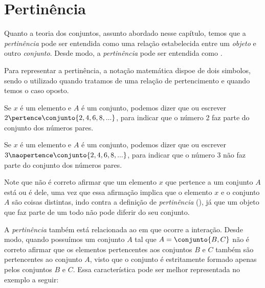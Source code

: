 \section{Pertinência}

Quanto a teoria dos conjuntos, assunto abordado nesse capítulo, temos que a \emph{pertinência} pode ser entendida como uma relação estabelecida entre um \emph{objeto} e outro \emph{conjunto}. Desde modo, a \emph{pertinência} pode ser entendida como \emph{}. 

Para representar a pertinência, a notação matemática dispoe de dois simbolos, sendo o \entreaspas{$\pertence$} utilizado quando tratamos de uma relação de pertencimento e \entreaspas{$\naopertence$} quando temos o caso oposto.

\begin{example}
    Se $x$ é um elemento e $A$ é um conjunto, podemos dizer que  ou escrever $2 \pertence \conjunto {2, 4, 6, 8, ...}$, para indicar que o número 2 faz parte do conjunto dos números pares.
\end{example}

\begin{example}
    Se $x$ é um elemento e $A$ é um conjunto, podemos dizer que  ou escrever $3 \naopertence \conjunto {2, 4, 6, 8, ...}$, para indicar que o número 3 não faz parte do conjunto dos números pares.
\end{example}

\begin{remark}
    Note que não é correto afirmar que um elemento $x$ que pertence a um conjunto $A$ está  ou é  dele, uma vez que essa afirmação implica que o elemento $x$ e o conjunto $A$ são coisas distintas, indo contra a definição de \emph{pertinência} (\emph{}), já que um objeto que faz parte de um todo não pode diferir do seu conjunto.
\end{remark}

A \emph{pertinência} também está relacionada ao  em que ocorre a interação. Desde modo, quando possuímos um conjunto $A$ tal que $A = \conjunto {B,C}$ não é correto afirmar que os elementos pertencentes aos conjuntos $B$ e $C$ também são pertencentes ao conjunto $A$, visto que o conjunto é estritamente formado apenas pelos conjuntos $B$ e $C$. Essa característica pode ser melhor representada no exemplo a seguir:

